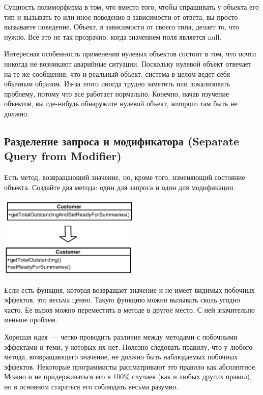 \documentclass{../../text-style}
\begin{document}
Сущность полиморфизма в том, что вместо того, чтобы спрашивать у объекта его тип и вызывать то или иное поведение в зависимости от ответа, вы просто вызываете поведение. Объект, в зависимости от своего типа, делает то, что нужно. Всё это не так прозрачно, когда значением поля является null. 

Интересная особенность применения нулевых объектов состоит в том, что почти никогда не возникают аварийные ситуации. Поскольку нулевой объект отвечает на те же сообщения, что и реальный объект, система в целом ведет себя обычным образом. Из-за этого иногда трудно заметить или локализовать проблему, потому что все работает нормально. Конечно, начав изучение объектов, вы где-нибудь обнаружите нулевой объект, которого там быть не должно. 

\subsection{Разделение запроса и модификатора (Separate Query from Modifier)}

Есть метод, возвращающий значение, но, кроме того, изменяющий состояние объекта. Создайте два метода: один для запроса и один для модификации.

\begin{center}
    \includegraphics[width=0.5\textwidth]{separateQueryFromModifier.png}
\end{center}

Если есть функция, которая возвращает значение и не имеет видимых побочных эффектов, это весьма ценно. Такую функцию можно вызывать сколь угодно часто. Ее вызов можно переместить в методе в другое место. С ней значительно меньше проблем.

Хорошая идея~--- четко проводить различие между методами с побочными эффектами и теми, у которых их нет. Полезно следовать правилу, что у любого метода, возвращающего значение, не должно быть наблюдаемых побочных эффектов. Некоторые программисты рассматривают это правило как абсолютное. Можно и не придерживаться его в 100\% случаев (как и любых других правил), но в основном стараться его соблюдать весьма разумно.
\end{document}
